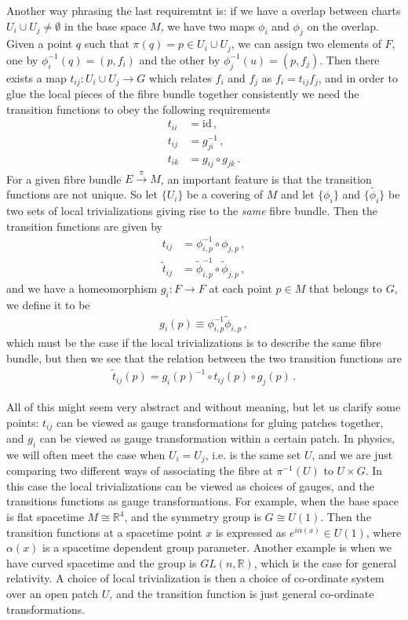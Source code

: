 Another way phrasing the last requiremtnt is: if we have a overlap between charts $U_{i}\cup U_{j}\neq\emptyset$ in the base space $M$, we have two maps $\phi_{i}$ and $\phi_{j}$ on the overlap. Given a point $q$ such that $\pi(q)=p\in U_{i}\cup U_{j}$, we can assign two elements of $F$, one by $\phi^{-1}_{i}(q)=(p,f_i)$ and the other by $\phi^{-1}_{j}(u)=(p,f_j)$. Then there exists a map $t_{ij}:U_{i}\cup U_{j}\rightarrow G$ which relates $f_i$ and $f_j$ as $f_i=t_{ij}f_j$, and in order to glue the local pieces of the fibre bundle together consistently we need the transition functions to obey the following requirements
\begin{align}
    t_{ii}&=\text{id}\,,
    \\
    t_{ij}&=g^{-1}_{ji}\,,
    \\
    t_{ik}&=g_{ij}\circ g_{jk}\,.
\end{align}
For a given fibre bundle $E\overset{\pi}{\longrightarrow} M$, an important feature is that the transition functions are not unique. So let $\{U_{i}\}$ be a covering of $M$ and let $\{\phi_i\}$ and $\{\tilde{\phi_i}\}$ be two sets of local trivializations giving rise to the \emph{same} fibre bundle. Then the transition functions are given by
\begin{align}
    t_{ij}&=\phi^{-1}_{i,p}\circ\phi_{j,p}\,,
    \\
    \tilde{t}_{ij}&=\tilde{\phi}^{-1}_{i,p}\circ\tilde{\phi}_{j,p}\,,
\end{align}
and we have a homeomorphism $g_{i}:F\rightarrow F$ at each point $p\in M$ that belongs to $G$, we define it to be
\begin{align}
    g_{i}(p)\equiv \phi^{-1}_{i,p}\tilde{\phi}_{i,p}\,,
\end{align}
which must be the case if the local trivializations is to describe the same fibre bundle, but then we see that the relation between the two transition functions are
\begin{align}
    \tilde{t}_{ij}(p)=g_{i}(p)^{-1}\circ t_{ij}(p)\circ g_{j}(p)\,.
\end{align}

All of this might seem very abstract and without meaning, but let us clarify some points: $t_{ij}$ can be viewed as gauge transformations for gluing patches together, and $g_i$ can be viewed as gauge transformation within a certain patch. In physics, we will often meet the case when $U_i=U_j$, i.e. is the same set $U$, and we are just comparing two different ways of associating the fibre at $\pi^{-1}(U)$ to $U\times G$. In this case the local trivializations can be viewed as choices of gauges, and the transitions functions as gauge transformations. For example, when the base space is flat spacetime $M\cong \mathbb{R}^{4}$, and the symmetry group is $G\cong U(1)$. Then the transition functions at a spacetime point $x$ is expressed as $e^{i\alpha(x)}\in U(1)$, where $\alpha(x)$ is a spacetime dependent group parameter. Another example is when we have curved spacetime and the group is $GL(n,\mathbb{R})$, which is the case for general relativity. A choice of local trivialization is then a choice of co-ordinate system over an open patch $U$, and the transition function is just general co-ordinate transformations.

